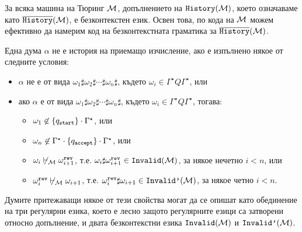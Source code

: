 \begin{lemma}
  За всяка машина на Тюринг $\mathcal{M}$, допълнението на $\texttt{History}(\mathcal{M})$, което означаваме като $\overline{\texttt{History}}(\mathcal{M})$, е безконтекстен език.
  Освен това, по кода на $\mathcal{M}$ можем ефективно да намерим код на безконтекстната граматика за $\overline{\texttt{History}}(\mathcal{M})$.
\end{lemma}
\begin{hint}
  Една дума $\alpha$ не е история на приемащо изчисление, ако е изпълнено някое от следните условия:
  \begin{itemize}
  \item 
    $\alpha$ не е от вида $\omega_1 \sharp \omega_2 \sharp \cdots \sharp \omega_n\sharp$,
    където $\omega_i \in \Gamma^\star Q \Gamma^\star$, или
  \item
    ако $\alpha$ е от вида $\omega_1 \sharp \omega_2 \sharp \cdots \sharp \omega_n\sharp$,
    където $\omega_i \in \Gamma^\star Q \Gamma^\star$, тогава:
    \begin{itemize}
    \item 
      $\omega_1 \not\in \{q_{\texttt{start}}\} \cdot \Gamma^\star$, или
    \item
      $\omega_n \not\in \Gamma^\star \cdot \{q_{\texttt{accept}}\} \cdot \Gamma^\star$, или
    \item
      $\omega_i \not\vdash_{\mathcal{M}} \omega^{\texttt{rev}}_{i+1}$, т.е. $\omega_i \sharp \omega^{\texttt{rev}}_{i+1} \in \texttt{Invalid}(\mathcal{M})$, за някое нечетно $i < n$, или
    \item
      $\omega^{\texttt{rev}}_i \not\vdash_{\mathcal{M}} \omega_{i+1}$, т.е. $\omega^{\texttt{rev}}_i \sharp \omega_{i+1} \in \texttt{Invalid'}(\mathcal{M})$, за някое четно $i < n$.
    \end{itemize}
  \end{itemize}
  Думите притежаващи някое от тези свойства могат да се опишат като обединение на три регулярни езика, което е лесно защото регулярните езици са затворени относно допълнение, и двата безконтекстни езика
  $\texttt{Invalid}(\mathcal{M})$ и $\texttt{Invalid'}(\mathcal{M})$.
\end{hint}

